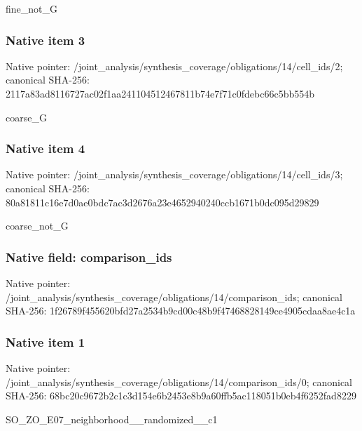 \documentclass[10pt,a4paper]{article}
\begin{document}
\begingroup\raggedright\sloppy fine\_\allowbreak{}not\_\allowbreak{}G\par\endgroup

\subsubsection{Native item 3}
Native pointer: /joint\_\allowbreak{}analysis/synthesis\_\allowbreak{}coverage/obligations/14/cell\_\allowbreak{}ids/2; canonical SHA-256: 2117a83ad8116727ac02f1aa241104512467811b74e7f71c0fdebc66c5bb554b

\begingroup\raggedright\sloppy coarse\_\allowbreak{}G\par\endgroup

\subsubsection{Native item 4}
Native pointer: /joint\_\allowbreak{}analysis/synthesis\_\allowbreak{}coverage/obligations/14/cell\_\allowbreak{}ids/3; canonical SHA-256: 80a81811c16e7d0ae0bdc7ac3d2676a23e4652940240ccb1671b0dc095d29829

\begingroup\raggedright\sloppy coarse\_\allowbreak{}not\_\allowbreak{}G\par\endgroup

\subsubsection{Native field: comparison\_\allowbreak{}ids}
Native pointer: /joint\_\allowbreak{}analysis/synthesis\_\allowbreak{}coverage/obligations/14/comparison\_\allowbreak{}ids; canonical SHA-256: 1f26789f455620bfd27a2534b9cd00c48b9f47468828149ce4905cdaa8ae4c1a

\subsubsection{Native item 1}
Native pointer: /joint\_\allowbreak{}analysis/synthesis\_\allowbreak{}coverage/obligations/14/comparison\_\allowbreak{}ids/0; canonical SHA-256: 68bc20c9672b2c1c3d154e6b2453e8b9a60ffb5ac118051b0eb4f6252fad8229

\begingroup\raggedright\sloppy SO\_\allowbreak{}ZO\_\allowbreak{}E07\_\allowbreak{}neighborhood\_\allowbreak{}\_\allowbreak{}randomized\_\allowbreak{}\_\allowbreak{}c1\par\endgroup
\end{document}
